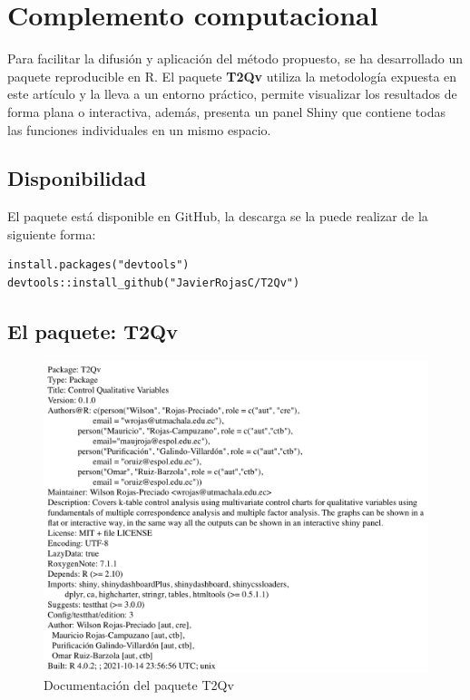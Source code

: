 \documentclass[water,article,submit,moreauthors,pdftex]{mdpi}
\begin{document}
\hypertarget{complemento-computacional}{%
\section{Complemento computacional}\label{complemento-computacional}}

Para facilitar la difusión y aplicación del método propuesto, se ha
desarrollado un paquete reproducible en R. El paquete \textbf{T2Qv}
utiliza la metodología expuesta en este artículo y la lleva a un entorno
práctico, permite visualizar los resultados de forma plana o
interactiva, además, presenta un panel Shiny que contiene todas las
funciones individuales en un mismo espacio.

\hypertarget{disponibilidad}{%
\subsection{Disponibilidad}\label{disponibilidad}}

El paquete está disponible en GitHub, la descarga se la puede realizar
de la siguiente forma:

\begin{verbatim}
install.packages("devtools")
devtools::install_github("JavierRojasC/T2Qv")
\end{verbatim}

\hypertarget{el-paquete-t2qv}{%
\subsection{El paquete: T2Qv}\label{el-paquete-t2qv}}

\begin{figure}[!ht]



\begin{center}\includegraphics[width=0.6\linewidth,]{DescrPack} \end{center}

\caption{Documentación del paquete T2Qv}

\label{fig:documentation}
\end{figure}
\end{document}
